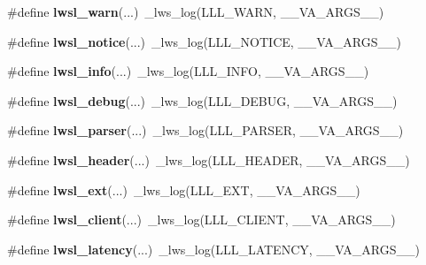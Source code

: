 \begin{DoxyCompactItemize}
\mbox{\label{group__log_ga1bcd293826c0a91d6e7ac3c54db72885}} 
\#define {\bfseries lwsl\+\_\+warn}(...)~\+\_\+lws\+\_\+log(L\+L\+L\+\_\+\+W\+A\+RN, \+\_\+\+\_\+\+V\+A\+\_\+\+A\+R\+G\+S\+\_\+\+\_\+)
\item 
\mbox{\label{group__log_ga86b3c56c638569eb93919c52a1d5dfaf}} 
\#define {\bfseries lwsl\+\_\+notice}(...)~\+\_\+lws\+\_\+log(L\+L\+L\+\_\+\+N\+O\+T\+I\+CE, \+\_\+\+\_\+\+V\+A\+\_\+\+A\+R\+G\+S\+\_\+\+\_\+)
\item 
\mbox{\label{group__log_gaf13957a4d9fb47c070b9320303c32502}} 
\#define {\bfseries lwsl\+\_\+info}(...)~\+\_\+lws\+\_\+log(L\+L\+L\+\_\+\+I\+N\+FO, \+\_\+\+\_\+\+V\+A\+\_\+\+A\+R\+G\+S\+\_\+\+\_\+)
\item 
\mbox{\label{group__log_ga74a1a3d4d96b146a0ac45faab0028ade}} 
\#define {\bfseries lwsl\+\_\+debug}(...)~\+\_\+lws\+\_\+log(L\+L\+L\+\_\+\+D\+E\+B\+UG, \+\_\+\+\_\+\+V\+A\+\_\+\+A\+R\+G\+S\+\_\+\+\_\+)
\item 
\mbox{\label{group__log_gaee051a14945bec746ed3b527f384dc72}} 
\#define {\bfseries lwsl\+\_\+parser}(...)~\+\_\+lws\+\_\+log(L\+L\+L\+\_\+\+P\+A\+R\+S\+ER, \+\_\+\+\_\+\+V\+A\+\_\+\+A\+R\+G\+S\+\_\+\+\_\+)
\item 
\mbox{\label{group__log_gaab72aa186eff075fb3d229cb99a35434}} 
\#define {\bfseries lwsl\+\_\+header}(...)~\+\_\+lws\+\_\+log(L\+L\+L\+\_\+\+H\+E\+A\+D\+ER, \+\_\+\+\_\+\+V\+A\+\_\+\+A\+R\+G\+S\+\_\+\+\_\+)
\item 
\mbox{\label{group__log_ga8e0877b452d80bc154793ad81bfce742}} 
\#define {\bfseries lwsl\+\_\+ext}(...)~\+\_\+lws\+\_\+log(L\+L\+L\+\_\+\+E\+XT, \+\_\+\+\_\+\+V\+A\+\_\+\+A\+R\+G\+S\+\_\+\+\_\+)
\item 
\mbox{\label{group__log_ga181ea1ed9ba604e493ce092850d9da90}} 
\#define {\bfseries lwsl\+\_\+client}(...)~\+\_\+lws\+\_\+log(L\+L\+L\+\_\+\+C\+L\+I\+E\+NT, \+\_\+\+\_\+\+V\+A\+\_\+\+A\+R\+G\+S\+\_\+\+\_\+)
\item 
\mbox{\label{group__log_gab5842ee4ec5f763d057869e083ff1cb0}} 
\#define {\bfseries lwsl\+\_\+latency}(...)~\+\_\+lws\+\_\+log(L\+L\+L\+\_\+\+L\+A\+T\+E\+N\+CY, \+\_\+\+\_\+\+V\+A\+\_\+\+A\+R\+G\+S\+\_\+\+\_\+)

\end{DoxyCompactItemize}
